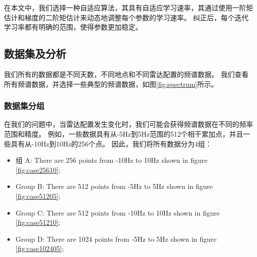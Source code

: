 在本文中，我们选择一种自适应算法，其具有自适应学习速率，其通过使用一阶矩估计和梯度的二阶矩估计来动态地调整每个参数的学习速率。 纠正后，每个迭代学习率都有明确的范围，使得参数更加稳定。
\subsection{数据集及分析}
我们所有的数据都是不同天数，不同地点和不同雷达配置的频谱数据。 我们查看所有频谱数据，并选择一些典型的频谱数据，如图\ref{fig:spectrum}所示。

\subsubsection{数据集分组}
在我们的问题中，当雷达配置发生变化时，我们可能会获得频谱数据在不同的频率范围和精度。 例如，一些数据具有从-5Hz到5Hz范围的512个相干累加点，并且一些具有从-10Hz到10Hz的256个点。 因此，我们将所有数据分为4组：

\begin{itemize}
	\item 组 A: There are 256 points from -10Hz to 10Hz shown in figure \ref{fig:case25610};
	\item Group B: There are 512 points from -5Hz to 5Hz shown in figure \ref{fig:case51205};
	\item Group C: There are 512 points from -10Hz to 10Hz shown in figure \ref{fig:case51210};
	\item Group D: There are 1024 points from -5Hz to 5Hz shown in figure \ref{fig:case102405};
\end{itemize}


